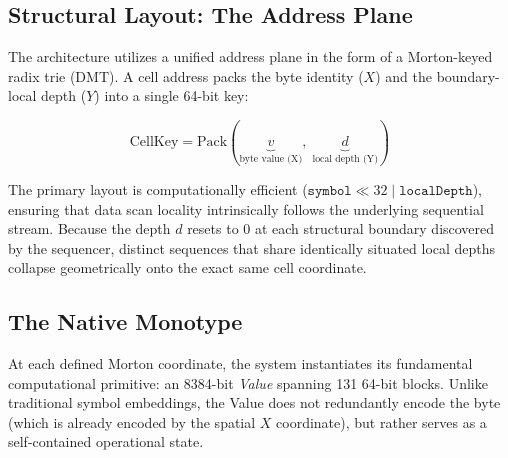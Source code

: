 \subsection{Structural Layout: The Address Plane}
\label{sec:manifold_layout}
\label{sec:manifold_architecture}

The architecture utilizes a unified address plane in the form of a Morton-keyed radix trie (DMT). A cell address packs the byte identity ($X$) and the boundary-local depth ($Y$) into a single 64-bit key:

\begin{equation}
  \text{CellKey} = \text{Pack}(\underbrace{v}_{\text{byte value (X)}},\; \underbrace{d}_{\text{local depth (Y)}})
  \label{eq:morton_pack}
\end{equation}

The primary layout is computationally efficient ($\texttt{symbol} \ll 32 \mid \texttt{localDepth}$), ensuring that data scan locality intrinsically follows the underlying sequential stream. Because the depth $d$ resets to 0 at each structural boundary discovered by the sequencer, distinct sequences that share identically situated local depths collapse geometrically onto the exact same cell coordinate. 

\subsection{The Native Monotype}
\label{sec:native_monotype}

At each defined Morton coordinate, the system instantiates its fundamental computational primitive: an 8384-bit \emph{Value} spanning 131 64-bit blocks. Unlike traditional symbol embeddings, the Value does not redundantly encode the byte (which is already encoded by the spatial $X$ coordinate), but rather serves as a self-contained operational state.

